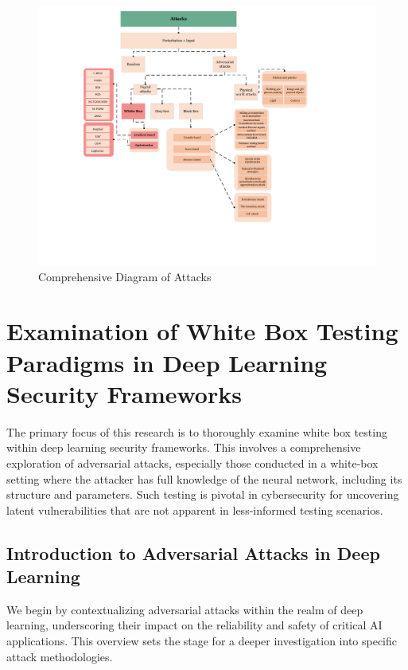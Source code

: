 \documentclass[10pt, conference, a4paper, final]{IEEEtran}
\begin{document}
\begin{figure}[!ht]
\centering
\includegraphics[width=1.3\textwidth]{proposal_images/AttacksFlowchart.pdf}
\caption{Comprehensive Diagram of Attacks}
\label{threat model}
\end{figure}

\section{Examination of White Box Testing Paradigms in Deep Learning Security Frameworks}

The primary focus of this research is to thoroughly examine white box testing within deep learning security frameworks. This involves a comprehensive exploration of adversarial attacks, especially those conducted in a white-box setting where the attacker has full knowledge of the neural network, including its structure and parameters. Such testing is pivotal in cybersecurity for uncovering latent vulnerabilities that are not apparent in less-informed testing scenarios.

\subsection{Introduction to Adversarial Attacks in Deep Learning}

We begin by contextualizing adversarial attacks within the realm of deep learning, underscoring their impact on the reliability and safety of critical AI applications. This overview sets the stage for a deeper investigation into specific attack methodologies.
\end{document}
